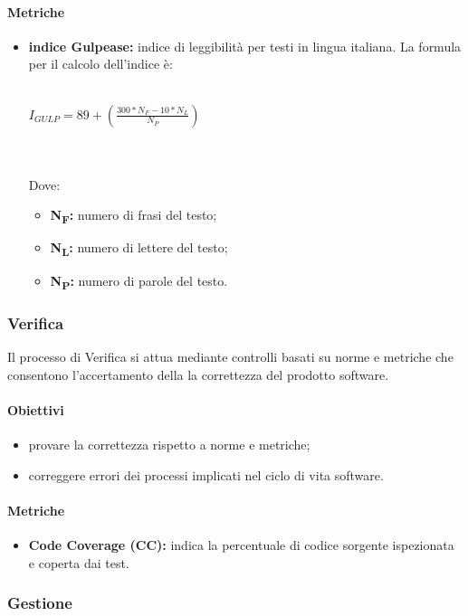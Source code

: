 \paragraph{Metriche}
\begin{itemize}
	\item \textbf{indice Gulpease:} indice di leggibilità per testi in lingua italiana. La formula per il calcolo dell'indice è:\\\\
	\centerline{
		\begin{math}
		I_{GULP}=89+(\frac{300*N_F-10*N_L}{N_P})
		\end{math}
	}
	\\\\Dove:
	\begin{itemize}
		\item \textbf{N\textsubscript{F}:} numero di frasi del testo;
		\item \textbf{N\textsubscript{L}:} numero di lettere del testo;
		\item \textbf{N\textsubscript{P}:} numero di parole del testo.
	\end{itemize}
\end{itemize}

\subsubsection{Verifica}
Il processo di Verifica si attua mediante controlli basati su norme e metriche che consentono l'accertamento della la correttezza del prodotto software.
\paragraph{Obiettivi}
\begin{itemize}
	\item provare la correttezza rispetto a norme e metriche;
	\item correggere errori dei processi implicati nel ciclo di vita software.
\end{itemize}
\paragraph{Metriche}
\begin{itemize}
	\item \textbf{Code Coverage (CC):} indica la percentuale di codice sorgente ispezionata e coperta dai test.
\end{itemize}

\subsubsection{Gestione}
